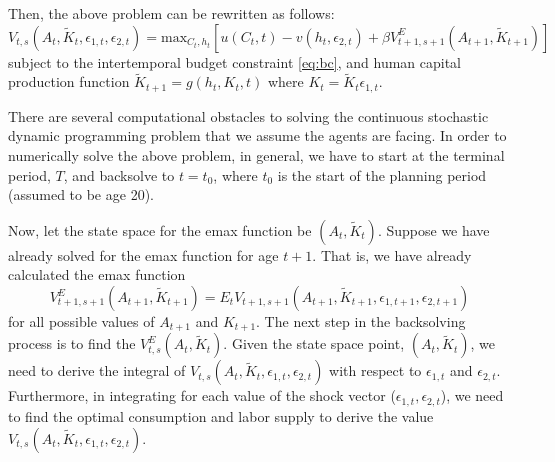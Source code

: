 \documentclass{article}
\begin{document}
Then, the above problem can be rewritten as follows:
\begin{equation*}
V_{t,s}(A_t, \tilde{K}_t,\epsilon_{1,t},\epsilon_{2,t}) = \text{max}_{C_t, h_t} [u(C_t,t) - v(h_t, \epsilon_{2,t}) + \beta V^E_{t+1,s+1} (A_{t+1},\tilde{K}_{t+1})]
\end{equation*}
subject to the intertemporal budget constraint \eqref{eq:bc}, and human capital production function $\tilde{K}_{t+1}=g(h_t,K_t,t)$ where $K_t=\tilde{K}_t \epsilon_{1,t}$.\par
There are several computational obstacles to solving the continuous stochastic dynamic programming problem that we assume the agents are facing. In order to numerically solve the above problem, in general, we have to start at the terminal period, $T$, and backsolve to $t = t_0$, where $t_0$ is the start of the planning period (assumed to be age 20).\par
Now, let the state space for the emax function be $(A_t, \tilde{K}_t)$. Suppose we have already solved for the emax function for age $t + 1$. That is, we have already calculated the emax function
\begin{equation*}
V^E_{t+1,s+1}(A_{t+1},\tilde{K}_{t+1}) = E_t V_{t+1,s+1}(A_{t+1},\tilde{K}_{t+1},\epsilon_{1,t+1},\epsilon_{2,t+1}) 
\end{equation*}
for all possible values of $A_{t+1}$ and $K_{t+1}$. The next step in the backsolving process is to find the $V^E_{t,s} (A_t,\tilde{K}_t)$. Given the state space point, $(A_t, \tilde{K}_t)$, we need to derive the integral of $V_{t,s}(A_t, \tilde{K}_t, \epsilon_{1,t},\epsilon_{2,t})$ with respect to $\epsilon_{1,t}$ and $\epsilon_{2,t}$. Furthermore, in integrating for each value of the shock vector ($\epsilon_{1,t},\epsilon_{2,t}$), we need to find the optimal consumption and labor supply to derive the value $V_{t,s}(A_t, \tilde{K}_t, \epsilon_{1,t},\epsilon_{2,t})$. \par
\end{document}
